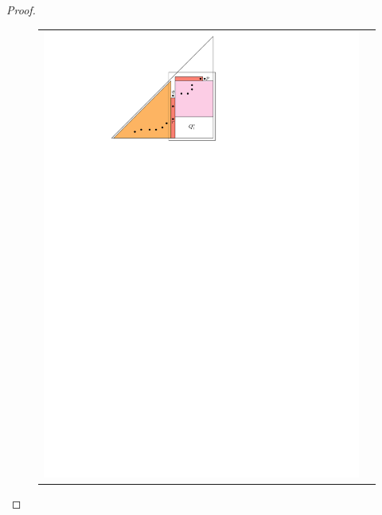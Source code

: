 \documentclass{patmorin}
\begin{document}
\begin{proof}
\begin{figure}
{\begin{tabular}{cc}
         \includegraphics{figs/nested-ears-david-1} &

\end{tabular}}
\end{figure}
\end{proof}
\end{document}
